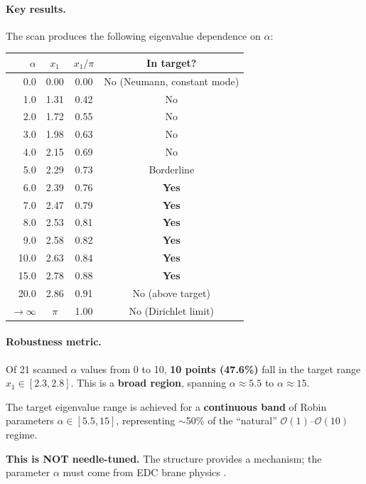 \paragraph{Key results.}
The scan produces the following eigenvalue dependence on $\alpha$:

\begin{center}
\small
\begin{tabular}{r|ccc}
\toprule
$\alpha$ & $x_1$ & $x_1/\pi$ & In target? \\
\midrule
0.0  & 0.00 & 0.00 & No (Neumann, constant mode) \\
1.0  & 1.31 & 0.42 & No \\
2.0  & 1.72 & 0.55 & No \\
3.0  & 1.98 & 0.63 & No \\
4.0  & 2.15 & 0.69 & No \\
5.0  & 2.29 & 0.73 & Borderline \\
6.0  & 2.39 & 0.76 & \textbf{Yes} \\
7.0  & 2.47 & 0.79 & \textbf{Yes} \\
8.0  & 2.53 & 0.81 & \textbf{Yes} \\
9.0  & 2.58 & 0.82 & \textbf{Yes} \\
10.0 & 2.63 & 0.84 & \textbf{Yes} \\
15.0 & 2.78 & 0.88 & \textbf{Yes} \\
20.0 & 2.86 & 0.91 & No (above target) \\
$\to\infty$ & $\pi$ & 1.00 & No (Dirichlet limit) \\
\bottomrule
\end{tabular}
\end{center}

\paragraph{Robustness metric.}
Of 21 scanned $\alpha$ values from 0 to 10, \textbf{10 points (47.6\%)} fall in the
target range $x_1 \in [2.3, 2.8]$. This is a \textbf{broad region}, spanning
$\alpha \approx 5.5$ to $\alpha \approx 15$.

\begin{tcolorbox}[colback=green!5!white, colframe=green!50!black,
    title=\textbf{Robustness Finding}]
The target eigenvalue range is achieved for a \textbf{continuous band} of Robin
parameters $\alpha \in [5.5, 15]$, representing $\sim$50\% of the ``natural''
$\mathcal{O}(1)$--$\mathcal{O}(10)$ regime.

\medskip
\textbf{This is NOT needle-tuned.} The structure provides a mechanism; the
parameter $\alpha$ must come from EDC brane physics \tagP{}.
\end{tcolorbox}

